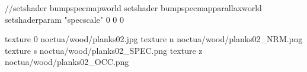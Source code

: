 //setshader bumpspecmapworld
setshader bumpspecmapparallaxworld
setshaderparam "specscale" 0 0 0

texture 0 noctua/wood/planks02.jpg
texture n noctua/wood/planks02_NRM.png
texture s noctua/wood/planks02_SPEC.png
texture z noctua/wood/planks02_OCC.png

